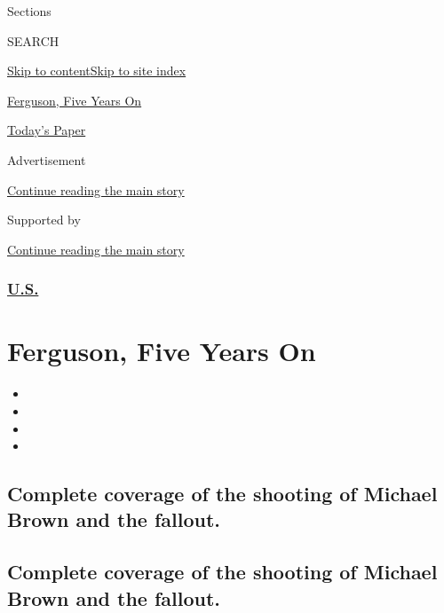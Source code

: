Sections

SEARCH

\protect\hyperlink{site-content}{Skip to
content}\protect\hyperlink{site-index}{Skip to site index}

\href{https://www.nytimes.com/news-event/ferguson-michael-brown}{Ferguson,
Five Years On}

\href{https://myaccount.nytimes.com/auth/login?response_type=cookie\&client_id=vi}{}

\href{https://www.nytimes.com/section/todayspaper}{Today's Paper}

Advertisement

\protect\hyperlink{after-top}{Continue reading the main story}

Supported by

\protect\hyperlink{after-sponsor}{Continue reading the main story}

\hypertarget{us}{%
\subsubsection{\texorpdfstring{\href{/section/us}{U.S.}}{U.S.}}\label{us}}

\hypertarget{ferguson-five-years-on}{%
\section{Ferguson, Five Years On}\label{ferguson-five-years-on}}

\begin{itemize}
\item
\item
\item
\item
\end{itemize}

\hypertarget{complete-coverage-of-the-shooting-of-michael-brown-and-the-fallout}{%
\subsection{Complete coverage of the shooting of Michael Brown and the
fallout.}\label{complete-coverage-of-the-shooting-of-michael-brown-and-the-fallout}}

\hypertarget{complete-coverage-of-the-shooting-of-michael-brown-and-the-fallout-1}{%
\subsection{Complete coverage of the shooting of Michael Brown and the
fallout.}\label{complete-coverage-of-the-shooting-of-michael-brown-and-the-fallout-1}}

